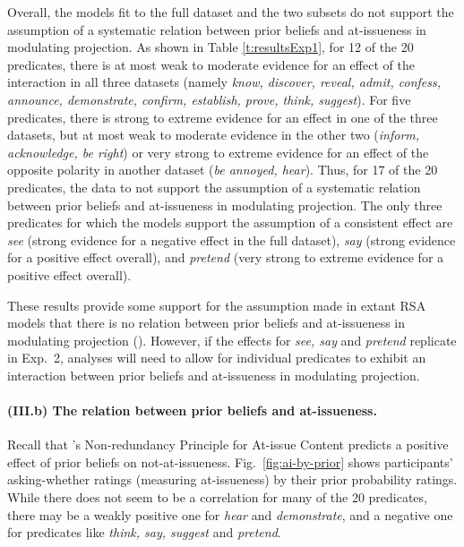 \documentclass[11pt,fleqn]{article}
\newcommand{\6}{\mbox{$[\hspace*{-.6mm}[$}}
\newcommand{\9}{\mbox{$]\hspace*{-.6mm}]$}}
\newcommand{\citepos}[1]{\citeauthor{#1}'s \citeyear{#1}}
\begin{document}
Overall, the models fit to the full dataset and the two subsets do not support the assumption of a systematic relation between prior beliefs and at-issueness in modulating projection. As shown in Table \ref{t:resultsExp1}, for 12 of the 20 predicates, there is at most weak to moderate evidence for an effect of the interaction in all three datasets (namely {\em know, discover, reveal, admit, confess, announce, demonstrate, confirm, establish, prove, think, suggest}). For five predicates, there is strong to extreme evidence for an effect in one of the three datasets, but at most weak to moderate evidence in the other two ({\em inform, acknowledge, be right}) or very strong to extreme evidence for an effect of the opposite polarity in another dataset ({\em be annoyed, hear}).  Thus, for 17 of the 20 predicates, the data to not support the assumption of a systematic relation between prior beliefs and at-issueness in modulating projection. The only three predicates for which the models support the assumption of a consistent effect are {\em see} (strong evidence for a negative effect in the full dataset), {\em say} (strong evidence for a positive effect overall), and {\em pretend} (very strong to extreme evidence for a positive effect overall). 

These results provide some support for the assumption made in extant RSA models that there is no relation between prior beliefs and at-issueness in modulating projection (\citealt{qing-etal2016,stevens-etal2017,warstadt2022,pan-degen2023}). However, if the effects for {\em see, say} and {\em pretend} replicate in Exp.~2, analyses will need to allow for individual predicates to exhibit an interaction between prior beliefs and at-issueness in modulating projection.

\paragraph{(III.b) The relation between prior beliefs and at-issueness.} 

Recall that \citepos{tonhauser-etal-eval} Non-redundancy Principle for At-issue Content predicts a positive effect of prior beliefs on not-at-issueness. Fig.~\ref{fig:ai-by-prior} shows participants' asking-whether ratings (measuring at-issueness) by their prior probability ratings. While there does not seem to be a correlation for many of the 20 predicates, there may be a weakly positive one for {\em hear} and {\em demonstrate}, and a negative one for predicates like {\em think, say, suggest} and {\em pretend}.
\end{document}
